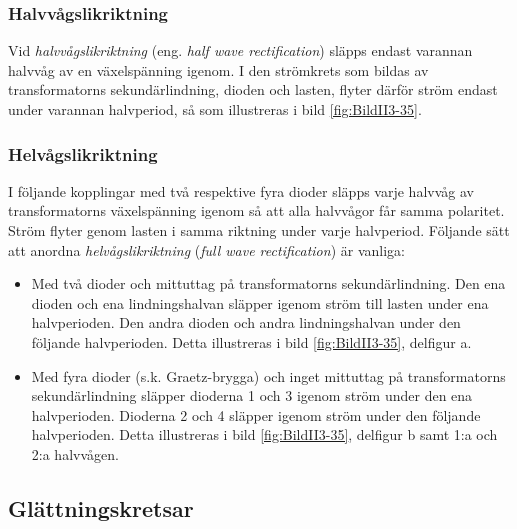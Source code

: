 
\subsubsection{Halvvågslikriktning}

Vid \emph{halvvågslikriktning} (eng. \emph{half wave rectification}) släpps endast
varannan halvvåg av en växelspänning igenom.
I den strömkrets som bildas av transformatorns sekundärlindning, dioden och
lasten, flyter därför ström endast under varannan halvperiod, så som
illustreras i bild \ref{fig:BildII3-35}.

\subsubsection{Helvågslikriktning}

I följande kopplingar med två respektive fyra dioder släpps varje halvvåg av
transformatorns växelspänning igenom så att alla halvvågor får samma polaritet.
Ström flyter genom lasten i samma riktning under varje halvperiod.
Följande sätt att anordna \emph{helvågslikriktning}
(\emph{full wave rectification}) är vanliga:
\begin{itemize}
\item Med två dioder och mittuttag på transformatorns sekundärlindning.
  Den ena dioden och ena lindningshalvan släpper igenom ström till lasten
  under ena halvperioden.
  Den andra dioden och andra lindningshalvan under den följande halvperioden.
  Detta illustreras i bild \ref{fig:BildII3-35}, delfigur a.

\item Med fyra dioder (s.k. Graetz-brygga) och inget mittuttag på
  transformatorns sekundärlindning släpper dioderna 1 och 3 igenom
  ström under den ena halvperioden.
  Dioderna 2 och 4 släpper igenom ström under den följande halvperioden.
  Detta illustreras i bild \ref{fig:BildII3-35}, delfigur b samt 1:a och 2:a
  halvvågen.
\end{itemize}

\subsection{Glättningskretsar}

